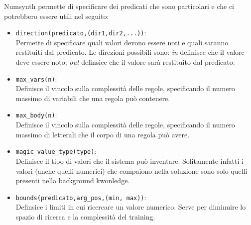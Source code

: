 \myskip

Numsynth permette di specificare dei predicati che sono particolari e che ci potrebbero essere utili nel seguito:
\begin{itemize}
    \item \texttt{direction(predicato,(dir1,dir2,...))}: \\
        Permette di specificare quali valori devono essere noti e quali saranno restituiti dal predicato. Le direzioni possibili sono: \textit{in} definisce che il valore deve essere noto; \textit{out} definsice che il valore sarà restituito dal predicato.
    \item \texttt{max\_vars(n)}: \\
        Definisce il vincolo sulla complessità delle regole, specificando il numero massimo di variabili che una regola può contenere.
    \item \texttt{max\_body(n)}: \\
        Definisce il vincolo sulla complessità delle regole, specificando il numero massimo di letterali che il corpo di una regola può avere.
    \item \texttt{magic\_value\_type(type)}: \\
        Definisce il tipo di valori che il sistema può inventare. Solitamente infatti i valori (anche quelli numerici) che compaiono nella soluzione sono solo quelli presenti nella background kwonledge.
    \item \texttt{bounds(predicato,arg\_pos,(min, max))}: \\
        Definsice i limiti in cui ricercare un valore numerico. Serve per diminuire lo spazio di ricerca e la complessità del training.
\end{itemize}